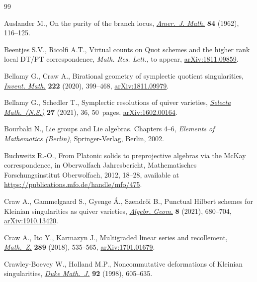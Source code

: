 \documentclass[10pt,a4paper]{amsart}
\numberwithin{equation}{section}
\begin{document}
\begin{thebibliography}{99}
\footnotesize\itemsep=0pt

Auslander M., On the purity of the branch locus, \href{https://doi.org/10.2307/2372807}{\textit{Amer.~J. Math.}}
 \textbf{84} (1962), 116--125.

Beentjes S.V., Ricolfi A.T., Virtual counts on {Q}uot schemes and the higher
 rank local {DT/PT} correspondence, \textit{Math. Res. Lett.}, {t}o appear,
 \href{https://arxiv.org/abs/1811.09859}{arXiv:1811.09859}.

Bellamy G., Craw A., Birational geometry of symplectic quotient singularities,
 \href{https://doi.org/10.1007/s00222-020-00972-9}{\textit{Invent. Math.}} \textbf{222} (2020), 399--468, \href{https://arxiv.org/abs/1811.09979}{arXiv:1811.09979}.

Bellamy G., Schedler T., Symplectic resolutions of quiver varieties,
 \href{https://doi.org/10.1007/s00029-021-00647-0}{\textit{Selecta Math.~(N.S.)}} \textbf{27} (2021), 36, 50~pages,
 \href{https://arxiv.org/abs/1602.00164}{arXiv:1602.00164}.

Bourbaki N., Lie groups and {L}ie algebras. {C}hapters 4--6, \textit{Elements of
 Mathematics (Berlin)}, \href{https://doi.org/10.1007/978-3-540-89394-3}{Springer-Verlag}, Berlin, 2002.

Buchweitz R.-O., From {P}latonic solids to preprojective algebras via the
 {M}c{K}ay correspondence, in Oberwolfach Jahresbericht, Mathematisches
 Forschungsinstitut Oberwolfach, 2012, 18--28, available at
 \url{https://publications.mfo.de/handle/mfo/475}.

Craw A., Gammelgaard S., Gyenge \'A., Szendr\H{o}i B., Punctual {H}ilbert schemes
 for {K}leinian singularities as quiver varieties, \href{https://doi.org/10.14231/AG-2021-021}{\textit{Algebr. Geom.}}
 \textbf{8} (2021), 680--704, \href{https://arxiv.org/abs/1910.13420}{arXiv:1910.13420}.

Craw A., Ito Y., Karmazyn J., Multigraded linear series and recollement,
 \href{https://doi.org/10.1007/s00209-017-1965-1}{\textit{Math.~Z.}} \textbf{289} (2018), 535--565, \href{https://arxiv.org/abs/1701.01679}{arXiv:1701.01679}.

Crawley-Boevey W., Holland M.P., Noncommutative deformations of {K}leinian
 singularities, \href{https://doi.org/10.1215/S0012-7094-98-09218-3}{\textit{Duke Math.~J.}} \textbf{92} (1998), 605--635.


\end{thebibliography}
\end{document}

